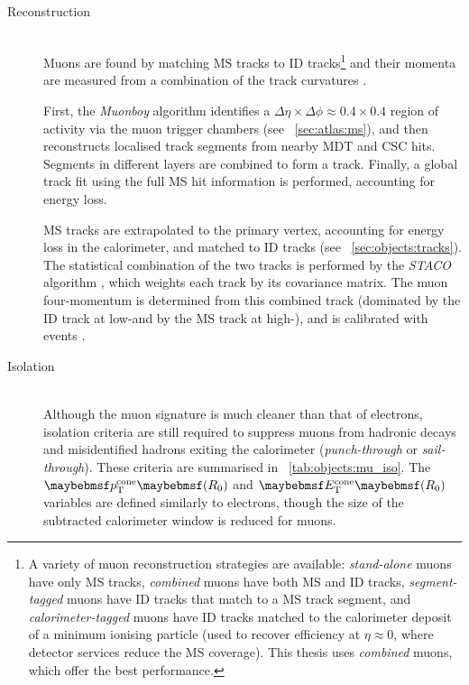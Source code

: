 \begin{description}
\item[Reconstruction] \hfill \\
	Muons are found by matching MS tracks to ID tracks\footnote{
		A variety of muon reconstruction strategies are available: \textit{stand-alone} 
		muons have only MS tracks, \textit{combined} muons have both MS and 
		ID tracks, \textit{segment-tagged} muons have ID tracks that match to a 
		MS track segment, and \textit{calorimeter-tagged} muons have ID 
		tracks matched to the calorimeter deposit of a minimum ionising particle (used to 
		recover efficiency at $\eta \approx 0$, where detector services reduce the MS 
		coverage). This thesis uses \textit{combined} muons, which offer the best 
		performance.
	}
	and their momenta are measured from a combination of the track curvatures 
	\cite{ATLAS:ExpectPerf}.

	First, the \textit{Muonboy} algorithm \cite{Muons:algorithms} identifies a 
	$\Delta\eta \times \Delta\phi \approx 0.4 \times 0.4$ region of activity via the muon 
	trigger chambers (see \Section~\ref{sec:atlas:ms}), and then reconstructs localised 
	track segments from nearby MDT and CSC hits. Segments in different layers are combined 
	to form a track. Finally, a global track fit using the full MS hit information is 
	performed, accounting for energy loss.

	MS tracks are extrapolated to the primary vertex, accounting for energy loss in 
	the calorimeter, and matched to ID tracks (see 
	\Section~\ref{sec:objects:tracks}). The statistical combination of the two 
	tracks is performed by the \textit{STACO} algorithm \cite{Muons:algorithms}, which
	weights each track by its covariance matrix. The muon four-momentum is determined 
	from this combined track (dominated by the ID track at low-\pt and by the 
	MS track at high-\pt), and is calibrated with \HepProcess{\PZ \HepTo \Pmu\Pmu}
	events \cite{Muons:2012}.

\item[Isolation] \hfill \\
	Although the muon signature is much cleaner than that of electrons, isolation criteria 
	are still required to suppress muons from hadronic decays and misidentified hadrons 
	exiting the calorimeter (\textit{punch-through} or \textit{sail-through}). These 
	criteria are summarised in \Table~\ref{tab:objects:mu_iso}. The $\ptcone{R_0}$ and 
	$\etcone{R_0}$ variables are defined similarly to electrons, though the size of the 
	subtracted calorimeter window is reduced for muons.


\end{description}
